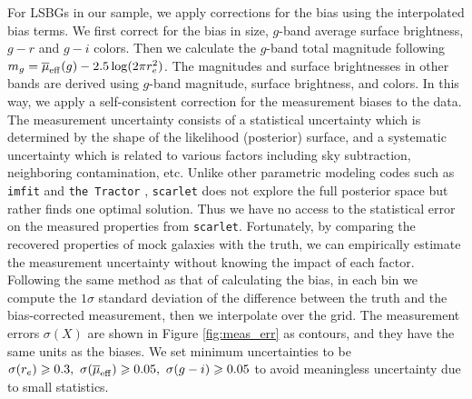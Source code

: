 \documentclass[twocolumn,astrosymb,twocolappendix]{aastex631}
\newcommand{\code}[1]{\texttt{#1}}
\newcommand{\sersic}{S\'ersic}
\begin{document}
\begin{CJK*}{UTF8}{gbsn}
For LSBGs in our sample, we apply corrections for the bias using the interpolated bias terms. We first correct for the bias in size, $g$-band average surface brightness, $g-r$ and $g-i$ colors. Then we calculate the $g$-band total magnitude following $m_g = \overline{\mu}_{\rm eff}(g) - 2.5\log(2\pi r_e^2)$. The magnitudes and surface brightnesses in other bands are derived using $g$-band magnitude, surface brightness, and colors. In this way, we apply a self-consistent correction for the measurement biases to the data. 
The measurement uncertainty consists of a statistical uncertainty which is determined by the shape of the likelihood (posterior) surface, and a systematic uncertainty which is related to various factors including sky subtraction, neighboring contamination, etc. Unlike other parametric modeling codes such as \code{imfit} \citep{imfit} and \code{the Tractor} \citep{Lang2016}, \code{scarlet} does not explore the full posterior space but rather finds one optimal solution. Thus we have no access to the statistical error on the measured properties from \code{scarlet}. Fortunately, by comparing the recovered properties of mock galaxies with the truth, we can empirically estimate the measurement uncertainty without knowing the impact of each factor. Following the same method as that of calculating the bias, in each bin we compute the $1\sigma$ standard deviation of the difference between the truth and the bias-corrected measurement, then we interpolate over the grid. The measurement errors $\sigma(X)$ are shown in Figure \ref{fig:meas_err} as contours, and they have the same units as the biases. We set minimum uncertainties to be $\sigma(r_e) \geqslant 0.3,\ \sigma(\overline{\mu}_{\rm eff}) \geqslant 0.05,\ \sigma(g-i) \geqslant 0.05$ to avoid meaningless uncertainty due to small statistics.




\end{CJK*}
\end{document}
